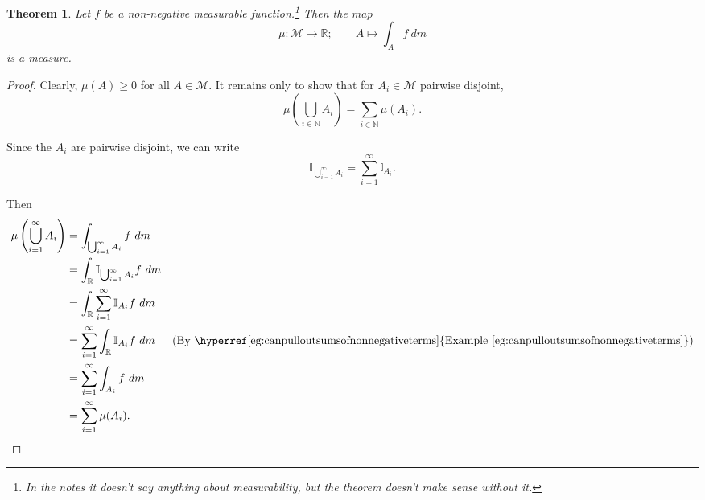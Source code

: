 \documentclass[a4paper]{scrartcl}
\newcommand{\R}{\mathbb{R}}
\newcommand{\N}{\mathbb{N}}
\theoremstyle{definition}
\theoremstyle{plain}
\newtheorem{theorem}{Theorem}[section]
\theoremstyle{remark}
\begin{document}

\begin{theorem}
  \label{thm:integrationagainstnonnegativefunctioismeasure}
  Let $f$ be a non-negative measurable function.\footnote{In the notes it doesn't say anything about measurability, but the theorem doesn't make sense without it.} Then the map
  \begin{equation*}
    \mu\colon \mathcal{M} \to \R;\qquad A \mapsto \int_{A} f\ dm
  \end{equation*}
  is a measure.
\end{theorem}
\begin{proof}
  Clearly, $\mu(A) \geq 0$ for all $A \in \mathcal{M}$. It remains only to show that for $A_{i} \in \mathcal{M}$ pairwise disjoint,
  \begin{equation*}
    \mu\left( \bigcup_{i \in \N} A_{i} \right) = \sum_{i \in \N} \mu(A_{i}).
  \end{equation*}

  Since the $A_{i}$ are pairwise disjoint, we can write
  \begin{equation*}
    \mathbb{I}_{\bigcup_{i = 1}^{\infty} A_{i}} = \sum_{i = 1}^{\infty} \mathbb{I}_{A_{i}}.
  \end{equation*}

  Then
  \begin{align*}
    \mu\left( \bigcup_{i = 1}^{\infty} A_{i} \right) &=  \int_{\bigcup_{i = 1}^{\infty} A_{i}} f\ dm \\
    &= \int_{\R} \mathbb{I}_{\bigcup_{i = 1}^{\infty} A_{i}} f\ dm \\
    &= \int_{\R} \sum_{i = 1}^{\infty} \mathbb{I}_{A_{i}} f\ dm \\
    &= \sum_{i = 1}^{\infty} \int_{\R} \mathbb{I}_{A_{i}}f\ dm & (\text{By \hyperref[eg:canpulloutsumsofnonnegativeterms]{Example~\ref*{eg:canpulloutsumsofnonnegativeterms}}}) \\
    &= \sum_{i = 1}^{\infty} \int_{A_{i}} f\ dm \\
    &= \sum_{i = 1}^{\infty} \mu(A_{i}).
  \end{align*}
\end{proof}
\end{document}
